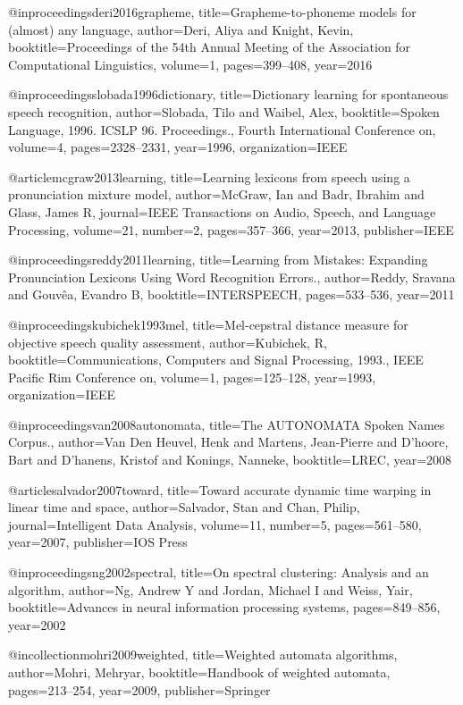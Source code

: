 @inproceedings{deri2016grapheme,
  title={Grapheme-to-phoneme models for (almost) any language},
  author={Deri, Aliya and Knight, Kevin},
  booktitle={Proceedings of the 54th Annual Meeting of the Association for Computational Linguistics},
  volume={1},
  pages={399--408},
  year={2016}
}

@inproceedings{slobada1996dictionary,
  title={Dictionary learning for spontaneous speech recognition},
  author={Slobada, Tilo and Waibel, Alex},
  booktitle={Spoken Language, 1996. ICSLP 96. Proceedings., Fourth International Conference on},
  volume={4},
  pages={2328--2331},
  year={1996},
  organization={IEEE}
}

@article{mcgraw2013learning,
  title={Learning lexicons from speech using a pronunciation mixture model},
  author={McGraw, Ian and Badr, Ibrahim and Glass, James R},
  journal={IEEE Transactions on Audio, Speech, and Language Processing},
  volume={21},
  number={2},
  pages={357--366},
  year={2013},
  publisher={IEEE}
}

@inproceedings{reddy2011learning,
  title={Learning from Mistakes: Expanding Pronunciation Lexicons Using Word Recognition Errors.},
  author={Reddy, Sravana and Gouv{\^e}a, Evandro B},
  booktitle={INTERSPEECH},
  pages={533--536},
  year={2011}
}

@inproceedings{kubichek1993mel,
  title={Mel-cepstral distance measure for objective speech quality assessment},
  author={Kubichek, R},
  booktitle={Communications, Computers and Signal Processing, 1993., IEEE Pacific Rim Conference on},
  volume={1},
  pages={125--128},
  year={1993},
  organization={IEEE}
}

@inproceedings{van2008autonomata,
  title={The AUTONOMATA Spoken Names Corpus.},
  author={Van Den Heuvel, Henk and Martens, Jean-Pierre and D'hoore, Bart and D'hanens, Kristof and Konings, Nanneke},
  booktitle={LREC},
  year={2008}
}

@article{salvador2007toward,
  title={Toward accurate dynamic time warping in linear time and space},
  author={Salvador, Stan and Chan, Philip},
  journal={Intelligent Data Analysis},
  volume={11},
  number={5},
  pages={561--580},
  year={2007},
  publisher={IOS Press}
}

@inproceedings{ng2002spectral,
  title={On spectral clustering: Analysis and an algorithm},
  author={Ng, Andrew Y and Jordan, Michael I and Weiss, Yair},
  booktitle={Advances in neural information processing systems},
  pages={849--856},
  year={2002}
}

@incollection{mohri2009weighted,
  title={Weighted automata algorithms},
  author={Mohri, Mehryar},
  booktitle={Handbook of weighted automata},
  pages={213--254},
  year={2009},
  publisher={Springer}
}

